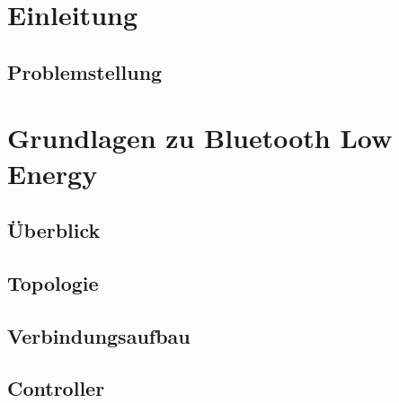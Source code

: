 \documentclass[doktyp=barbeit]{TUBAFarbeiten}
\begin{document}
\maketitle

\TUBAFErklaerungsseite



\tableofcontents
\newpage
\listoffigures
\newpage
\listoftables

\newpage
\section{Einleitung}
	\label{sec: einleitung}
	

	\subsection{Problemstellung}
		\label{sec: problemstellung}
		

\newpage
\section{Grundlagen zu Bluetooth Low Energy}
\label{sec: grundlagen le}

	\subsection{Überblick}
		\label{sec: le ueberblick}
		

	\subsection{Topologie}
		\label{sec: le topologie}
		

	\subsection{Verbindungsaufbau}
		\label{sec: le verbindungsaufbau}
		

	\subsection{Controller}
		\label{sec: le controller}
		
\end{document}
